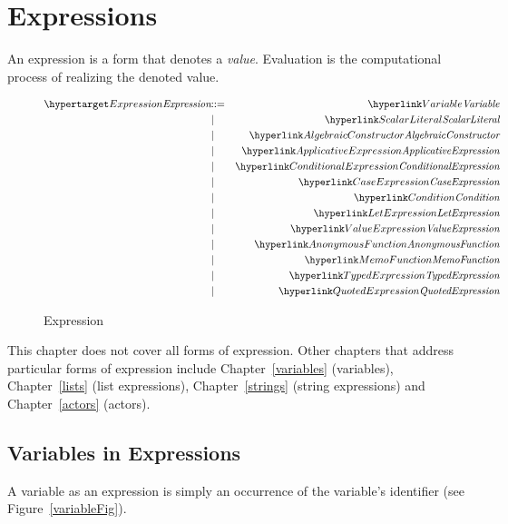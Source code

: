 \chapter{Expressions}
\label{expressions}

An expression is a form that denotes a \emph{value}. Evaluation is the computational process of realizing the denoted value.  
\begin{figure}[htbp]
\begin{eqnarray*}
\ntDef{Expression}&\arrow&\ntRef{Variable}\\
&\choice&\ntRef{ScalarLiteral}\\
&\choice&\ntRef{AlgebraicConstructor}\\
&\choice&\ntRef{ApplicativeExpression}\\
&\choice&\ntRef{ConditionalExpression}\\
&\choice&\ntRef{CaseExpression}\\
&\choice&\ntRef{Condition}\\
&\choice&\ntRef{LetExpression}\\
&\choice&\ntRef{ValueExpression}\\
&\choice&\ntRef{AnonymousFunction}\\
&\choice&\ntRef{MemoFunction}\\
&\choice&\ntRef{TypedExpression}\\
&\choice&\ntRef{QuotedExpression}
\end{eqnarray*}
\caption{Expression}
\label{expressionFig}
\end{figure}

\begin{aside}
This chapter does not cover all forms of expression. Other chapters that address particular forms of expression include Chapter~\vref{variables} (variables), Chapter~\vref{lists} (list expressions), Chapter~\vref{strings} (string expressions) and Chapter~\vref{actors} (actors).
\end{aside}

\section{Variables in Expressions}
\label{varExpression}
A variable as an expression is simply an occurrence of the variable's identifier (see Figure~\vref{variableFig}).

